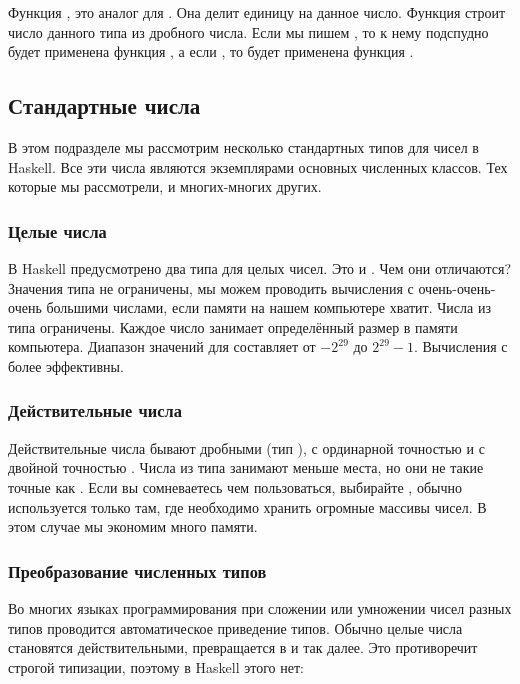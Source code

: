 Функция , это аналог  для . Она делит
единицу на данное число. Функция  строит число данного
типа из дробного числа. Если мы пишем , то к нему подспудно будет
применена функция , а если , то будет применена
функция .

\subsection{Стандартные числа}

В этом подразделе мы рассмотрим несколько стандартных типов для чисел в
Haskell. Все эти числа являются экземплярами основных численных классов.
Тех которые мы рассмотрели, и многих-многих других.

\subsubsection{Целые числа}

В Haskell предусмотрено два типа для целых чисел. Это  и
. Чем они отличаются? Значения типа  не ограничены,
мы можем проводить вычисления с очень-очень-очень большими числами, если
памяти на нашем компьютере хватит. Числа из типа  ограничены.
Каждое число занимает определённый размер в памяти компьютера. Диапазон
значений для  составляет от $-2^{29}$ до $2^{29}-1$. Вычисления
с  более эффективны.

\subsubsection{Действительные числа}

 Действительные
числа бывают дробными (тип ), с ординарной точностью
 и с двойной точностью . Числа из типа 
занимают меньше места, но они не такие точные как . Если вы
сомневаетесь чем пользоваться, выбирайте , обычно 
используется только там, где необходимо хранить огромные массивы чисел.
В этом случае мы экономим много памяти.

\subsubsection{Преобразование численных типов}

Во многих языках программирования при сложении или умножении чисел
разных типов проводится автоматическое приведение типов. Обычно целые
числа становятся действительными,  превращается в 
и так далее. Это противоречит строгой типизации, поэтому в Haskell этого
нет:


